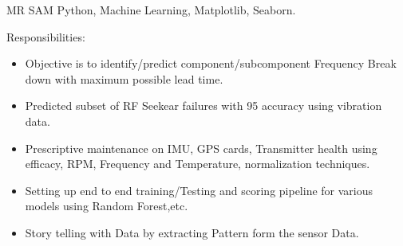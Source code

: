 %
%
%


\renewcommand{\baselinestretch}{1.3}

\begin{keywords}
		{MR SAM }
		{Python, Machine Learning, Matplotlib, Seaborn.}
\end{keywords}
\begin{experiences}
  \experience
    { }   {Responsibilities:}{}{}
    {} {
                      \begin{itemize}
                        \item Objective is to identify/predict component/subcomponent Frequency Break down with maximum possible lead time.                          
                        \item Predicted subset of RF Seekear failures with 95\text{\%}  accuracy using vibration data.                                        
                        \item Prescriptive maintenance on IMU, GPS cards, Transmitter health using efficacy, RPM, Frequency and Temperature,  normalization techniques.
                        
                        \item Setting up end to end training/Testing and scoring pipeline for various models using Random Forest,etc.
                        
                        \item Story telling with Data by extracting Pattern form the sensor  Data.
                        
                        
                        
                      \end{itemize}
                    }


\end{experiences}


